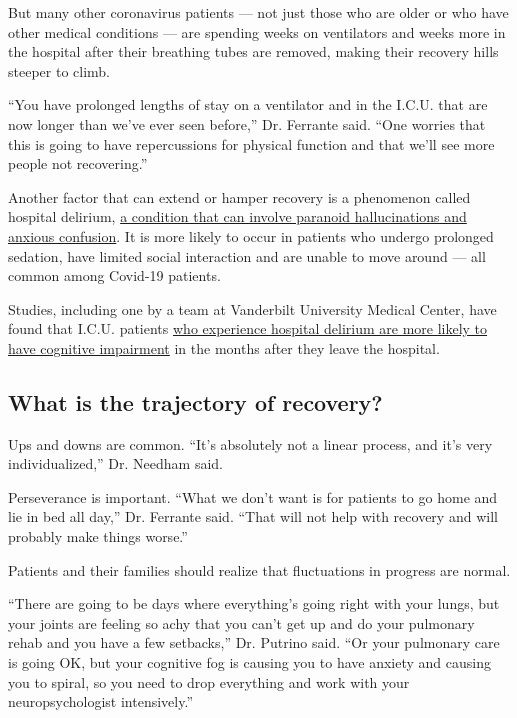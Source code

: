 But many other coronavirus patients --- not just those who are older or
who have other medical conditions --- are spending weeks on ventilators
and weeks more in the hospital after their breathing tubes are removed,
making their recovery hills steeper to climb.

``You have prolonged lengths of stay on a ventilator and in the I.C.U.
that are now longer than we've ever seen before,'' Dr. Ferrante said.
``One worries that this is going to have repercussions for physical
function and that we'll see more people not recovering.''

Another factor that can extend or hamper recovery is a phenomenon called
hospital delirium,
\href{https://www.nytimes.com/2020/06/28/health/coronavirus-delirium-hallucinations.html\#commentsContainer}{a
condition that can involve paranoid hallucinations and anxious
confusion}. It is more likely to occur in patients who undergo prolonged
sedation, have limited social interaction and are unable to move around
--- all common among Covid-19 patients.

Studies, including one by a team at Vanderbilt University Medical
Center, have found that I.C.U. patients
\href{https://www.nejm.org/doi/full/10.1056/NEJMoa1301372}{who
experience hospital delirium are more likely to have cognitive
impairment} in the months after they leave the hospital.

\hypertarget{what-is-the-trajectory-of-recovery}{%
\subsection{What is the trajectory of
recovery?}\label{what-is-the-trajectory-of-recovery}}

Ups and downs are common. ``It's absolutely not a linear process, and
it's very individualized,'' Dr. Needham said.

Perseverance is important. ``What we don't want is for patients to go
home and lie in bed all day,'' Dr. Ferrante said. ``That will not help
with recovery and will probably make things worse.''

Patients and their families should realize that fluctuations in progress
are normal.

``There are going to be days where everything's going right with your
lungs, but your joints are feeling so achy that you can't get up and do
your pulmonary rehab and you have a few setbacks,'' Dr. Putrino said.
``Or your pulmonary care is going OK, but your cognitive fog is causing
you to have anxiety and causing you to spiral, so you need to drop
everything and work with your neuropsychologist intensively.''

